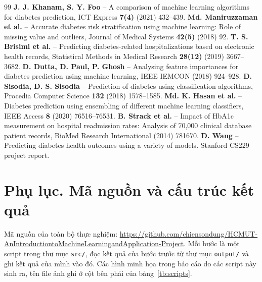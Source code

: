 \documentclass[a4paper]{report}
\begin{document}
\phansau
{}
\begin{thebibliography}{99}
 \textbf{J. J. Khanam, S. Y. Foo} – A comparison of machine learning algorithms for diabetes prediction, ICT Express \textbf{7(4)} (2021) 432–439.
 \textbf{Md. Maniruzzaman et al.} – Accurate diabetes risk stratification using machine learning: Role of missing value and outliers, Journal of Medical Systems \textbf{42(5)} (2018) 92.
 \textbf{T. S. Brisimi et al.} – Predicting diabetes-related hospitalizations based on electronic health records, Statistical Methods in Medical Research \textbf{28(12)} (2019) 3667–3682.
 \textbf{D. Dutta, D. Paul, P. Ghosh} – Analysing feature importances for diabetes prediction using machine learning, IEEE IEMCON (2018) 924–928.
 \textbf{D. Sisodia, D. S. Sisodia} – Prediction of diabetes using classification algorithms, Procedia Computer Science \textbf{132} (2018) 1578–1585.
 \textbf{Md. K. Hasan et al.} – Diabetes prediction using ensembling of different machine learning classifiers, IEEE Access \textbf{8} (2020) 76516–76531.
 \textbf{B. Strack et al.} – Impact of HbA1c measurement on hospital readmission rates: Analysis of 70,000 clinical database patient records, BioMed Research International (2014) 781670.
 \textbf{D. Wang} – Predicting diabetes health outcomes using a variety of models. Stanford CS229 project report.
\end{thebibliography}


\phuluc
\chapter*{Phụ lục. Mã nguồn và cấu trúc kết quả}

Mã nguồn của toàn bộ thực nghiệm: \url{https://github.com/chiensondung/HCMUT-AnIntroductiontoMachineLearningandApplication-Project}. Mỗi bước là một script trong thư mục \texttt{src/\allowbreak{}}, đọc kết quả của bước trước từ thư mục \texttt{output/\allowbreak{}} và ghi kết quả của mình vào đó. Các hình minh họa trong báo cáo do các script này sinh ra, tên file ảnh ghi ở cột bên phải của bảng~\ref{tb:scripts}.
\end{document}
